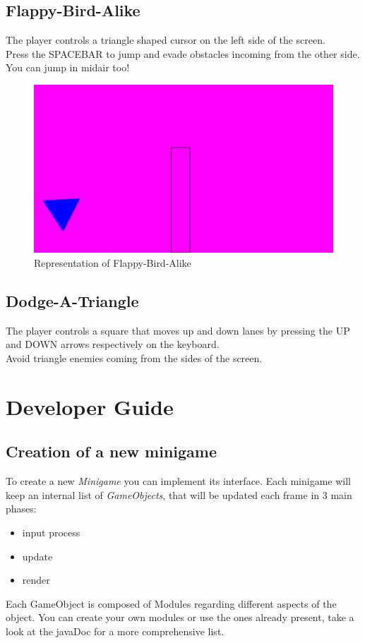 \documentclass[a4paper,12pt]{report}
\begin{document}
\section*{Flappy-Bird-Alike}
The player controls a triangle shaped cursor on the left side of the screen.\\
Press the SPACEBAR to jump and evade obstacles incoming from the other side. You can jump in midair too!
\begin{figure}[H]
	\centering{}
	\includegraphics[width=330pt]{res/Fba.png}
	\caption{Representation of Flappy-Bird-Alike}
\end{figure}

\section*{Dodge-A-Triangle}
The player controls a square that moves up and down lanes by pressing the UP and DOWN arrows respectively on the keyboard.\\
Avoid triangle enemies coming from the sides of the screen.

\chapter{Developer Guide}
\section*{Creation of a new minigame}
To create a new \textit{Minigame} you can implement its interface.
Each minigame will keep an internal list of \textit{GameObjects}, that will be updated each frame in 3 main phases:
\begin{itemize}
	\item input process
	\item update
	\item render
\end{itemize}
Each GameObject is composed of Modules regarding different aspects of the object.
You can create your own modules or use the ones already present, take a look at the javaDoc for a more comprehensive list.
\end{document}
